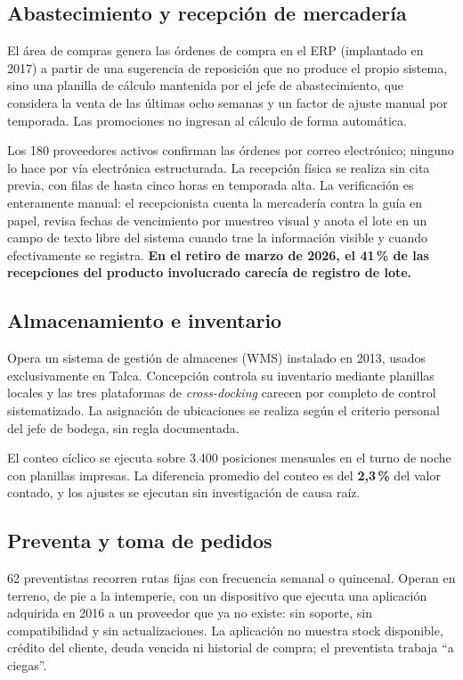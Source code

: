 \subsection{Abastecimiento y recepción de mercadería}

El área de compras genera las órdenes de compra en el ERP (implantado en 2017) a partir
de una sugerencia de reposición que no produce el propio sistema, sino una planilla de
cálculo mantenida por el jefe de abastecimiento, que considera la venta de las últimas
ocho semanas y un factor de ajuste manual por temporada. Las promociones no ingresan al
cálculo de forma automática.

Los 180 proveedores activos confirman las órdenes por correo electrónico; ninguno lo hace
por vía electrónica estructurada. La recepción física se realiza sin cita previa, con
filas de hasta cinco horas en temporada alta. La verificación es enteramente manual: el
recepcionista cuenta la mercadería contra la guía en papel, revisa fechas de vencimiento
por muestreo visual y anota el lote en un campo de texto libre del sistema cuando trae
la información visible y cuando efectivamente se registra. \textbf{En el retiro de marzo
de 2026, el 41\,\% de las recepciones del producto involucrado carecía de registro de
lote.}

\subsection{Almacenamiento e inventario}

Opera un sistema de gestión de almacenes (WMS) instalado en 2013, usados exclusivamente
en Talca. Concepción controla su inventario mediante planillas locales y las tres
plataformas de \emph{cross-docking} carecen por completo de control sistematizado. La
asignación de ubicaciones se realiza según el criterio personal del jefe de bodega, sin
regla documentada.

El conteo cíclico se ejecuta sobre 3.400 posiciones mensuales en el turno de noche con
planillas impresas. La diferencia promedio del conteo es del \textbf{2,3\,\%} del valor
contado, y los ajustes se ejecutan sin investigación de causa raíz.

\subsection{Preventa y toma de pedidos}

62 preventistas recorren rutas fijas con frecuencia semanal o quincenal. Operan en
terreno, de pie a la intemperie, con un dispositivo que ejecuta una aplicación adquirida
en 2016 a un proveedor que ya no existe: sin soporte, sin compatibilidad y sin
actualizaciones. La aplicación no muestra stock disponible, crédito del cliente, deuda
vencida ni historial de compra; el preventista trabaja ``a ciegas''.

